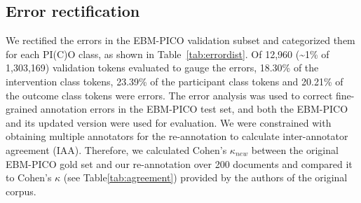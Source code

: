 \documentclass[10.7pt,]{article}
\begin{document}
\subsection{Error rectification}
%
We rectified the errors in the EBM-PICO validation subset and categorized them for each PI(C)O class, as shown in Table~\ref{tab:errordist}.
Of 12,960 (\textasciitilde1\% of 1,303,169) validation tokens evaluated to gauge the errors, 18.30\% of the intervention class tokens, 23.39\% of the participant class tokens and 20.21\% of the outcome class tokens were errors.
The error analysis was used to correct fine-grained annotation errors in the EBM-PICO test set, and both the EBM-PICO and its updated version were used for evaluation.
We were constrained with obtaining multiple annotators for the re-annotation to calculate inter-annotator agreement (IAA).
Therefore, we calculated Cohen's $\kappa_{new}$ between the original EBM-PICO gold set and our re-annotation over 200 documents and compared it to Cohen's $\kappa$ (see Table\ref{tab:agreement}) provided by the authors of the original corpus.\cite{nye2018corpus}
\end{document}
